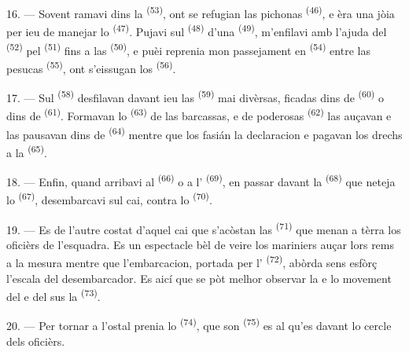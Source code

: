 16. --- Sovent ramavi dins la  \textsuperscript{(53)}, ont
se refugian las pichonas  \textsuperscript{(46)}, e èra una
jòia per ieu de manejar lo  \textsuperscript{(47)}. Pujavi sul
 \textsuperscript{(48)} d'una 
\textsuperscript{(49)}, m'enfilavi amb l'ajuda del 
\textsuperscript{(52)} pel  \textsuperscript{(51)} fins a las
 \textsuperscript{(50)}, e puèi reprenia mon passejament en
 \textsuperscript{(54)} entre las pesucas 
\textsuperscript{(55)}, ont s'eissugan los 
\textsuperscript{(56)}.

17. --- Sul  \textsuperscript{(58)} desfilavan davant ieu las
 \textsuperscript{(59)} mai divèrsas, ficadas dins de
 \textsuperscript{(60)} o dins de 
\textsuperscript{(61)}. Formavan lo  \textsuperscript{(63)} de
las barcassas, e de poderosas  \textsuperscript{(62)} las auçavan e
las pausavan dins de  \textsuperscript{(64)} mentre que los
 fasián la declaracion e pagavan los drechs a la
 \textsuperscript{(65)}.

18. --- Enfin, quand arribavi al  \textsuperscript{(66)} o a
l' \textsuperscript{(69)}, en passar davant la 
\textsuperscript{(68)} que neteja lo  \textsuperscript{(67)},
desembarcavi sul cai, contra lo  \textsuperscript{(70)}.

19. --- Es de l'autre costat d'aquel cai que s'acòstan las 
\textsuperscript{(71)} que menan a tèrra los oficièrs de l'esquadra. Es un
espectacle bèl de veire los mariniers auçar lors rems a la mesura mentre que
l'embarcacion, portada per l' \textsuperscript{(72)}, abòrda sens
esfòrç l'escala del desembarcador. Es aicí que se pòt melhor observar la
 e lo movement del  e del  sus la
 \textsuperscript{(73)}.

\VUsaut{3.0mm}
\VUsaut{3.0mm}

20. --- Per tornar a l'ostal prenia lo 
\textsuperscript{(74)}, que son  \textsuperscript{(75)} es al
 qu'es davant lo cercle dels oficièrs.

